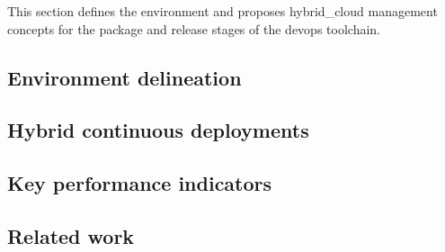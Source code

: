 \documentclass[../main.tex]{subfiles}
\begin{document}
    This section defines the environment and proposes \gls{hybrid_cloud} management concepts for the package and release stages of the \gls{devops} toolchain.

    \subsection{Environment delineation}
    \label{subsec:concepts-env}

    

    \subsection{Hybrid continuous deployments}
    \label{subsec:concepts-deploy}

    

    \subsection{Key performance indicators}
    \label{subsec:concepts-kpis}

    

    \subsection{Related work}
    \label{subsec:concepts-related}

    
\end{document}
